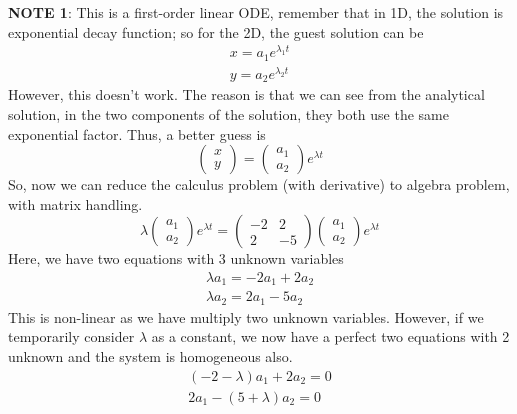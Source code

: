{\bf NOTE 1}: This is a first-order linear ODE, remember that in 1D,
the solution is exponential decay function; so for the 2D, the guest
solution can be
\begin{eqnarray*}
  x = a_1e^{\lambda_1t} \\
  y = a_2e^{\lambda_2t} 
\end{eqnarray*}
However, this doesn't work. The reason is that we can see from the
analytical solution, in the two components of the solution, they both
use the same exponential factor. Thus, a better guess is
\begin{equation*}
  \left(
    \begin{array}{c}
      x \\ y
    \end{array}
  \right)  =  \left(
    \begin{array}{c}
      a_1 \\ a_2
    \end{array}
  \right) e^{\lambda t}
\end{equation*}
So, now we can reduce the calculus problem (with derivative) to
algebra problem, with matrix handling. 
\begin{equation}
  \label{eq:599}
  \lambda \left(
    \begin{array}{c}
      a_1 \\ a_2
    \end{array}
  \right) e^{\lambda t} =   \left(
    \begin{array}{cc}
      -2  & 2 \\ 2 & -5
    \end{array}
  \right)   
  \left(
    \begin{array}{c}
      a_1 \\ a_2
    \end{array}
  \right) e^{\lambda t}
\end{equation}
Here, we have two equations with 3 unknown variables
\begin{eqnarray*}
  \lambda a_1 = -2a_1 + 2a_2 \\
  \lambda a_2 = 2a_1 - 5a_2
\end{eqnarray*}
This is non-linear as we have multiply two unknown variables. However,
if we temporarily consider $\lambda$ as a constant, we now have a
perfect two equations with 2 unknown and the system is homogeneous
also. 
\begin{equation}
  \label{eq:600}
  \begin{split}
    (-2-\lambda) a_1 + 2a_2 = 0 \\
    2 a_1 - (5+\lambda)a_2 = 0
  \end{split}
\end{equation}
